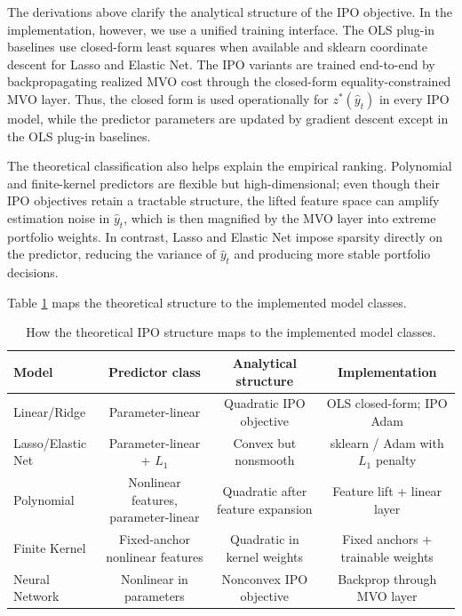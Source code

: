 \documentclass{article}
\begin{document}
The derivations above clarify the analytical structure of the IPO objective.
In the implementation, however, we use a unified training interface. The OLS
plug-in baselines use closed-form least squares when available and sklearn
coordinate descent for Lasso and Elastic Net. The IPO variants are trained
end-to-end by backpropagating realized MVO cost through the closed-form
equality-constrained MVO layer. Thus, the closed form is used operationally for
\(z^*(\hat y_t)\) in every IPO model, while the predictor parameters are updated
by gradient descent except in the OLS plug-in baselines.

The theoretical classification also helps explain the empirical ranking.
Polynomial and finite-kernel predictors are flexible but high-dimensional; even
though their IPO objectives retain a tractable structure, the lifted feature
space can amplify estimation noise in \(\hat y_t\), which is then magnified by
the MVO layer into extreme portfolio weights. In contrast, Lasso and Elastic
Net impose sparsity directly on the predictor, reducing the variance of
\(\hat y_t\) and producing more stable portfolio decisions.

Table \ref{tab:implementation-mapping} maps the theoretical structure to the
implemented model classes.

\begin{table}[h]
\centering
\begin{tabular}{lccc}
\toprule
Model & Predictor class & Analytical structure & Implementation \\
\midrule
Linear/Ridge
& Parameter-linear
& Quadratic IPO objective
& OLS closed-form; IPO Adam \\

Lasso/Elastic Net
& Parameter-linear + \(L_1\)
& Convex but nonsmooth
& sklearn / Adam with \(L_1\) penalty \\

Polynomial
& Nonlinear features, parameter-linear
& Quadratic after feature expansion
& Feature lift + linear layer \\

Finite Kernel
& Fixed-anchor nonlinear features
& Quadratic in kernel weights
& Fixed anchors + trainable weights \\

Neural Network
& Nonlinear in parameters
& Nonconvex IPO objective
& Backprop through MVO layer \\
\bottomrule
\end{tabular}
\caption{How the theoretical IPO structure maps to the implemented model classes.}
\label{tab:implementation-mapping}
\end{table}
\end{document}
